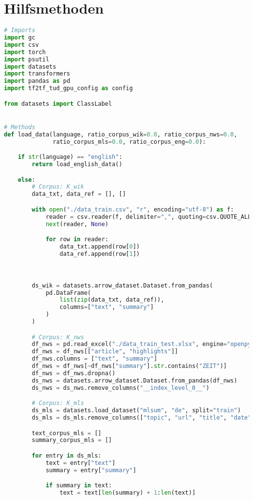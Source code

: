 \section*{Hilfsmethoden}
\begin{lstlisting}[language=Python, caption=Hilfsmethoden]
# Imports
import gc
import csv
import torch
import psutil
import datasets
import transformers
import pandas as pd
import tf2tf_tud_gpu_config as config

from datasets import ClassLabel


# Methods
def load_data(language, ratio_corpus_wik=0.0, ratio_corpus_nws=0.0,
              ratio_corpus_mls=0.0, ratio_corpus_eng=0.0):

    if str(language) == "english":
        return load_english_data()

    else:
        # Corpus: K_wik
        data_txt, data_ref = [], []

        with open("./data_train.csv", "r", encoding="utf-8") as f:
            reader = csv.reader(f, delimiter=",", quoting=csv.QUOTE_ALL)
            next(reader, None)

            for row in reader:
                data_txt.append(row[0])
                data_ref.append(row[1])



        ds_wik = datasets.arrow_dataset.Dataset.from_pandas(
            pd.DataFrame(
                list(zip(data_txt, data_ref)),
                columns=["text", "summary"]
            )
        )

        # Corpus: K_nws
        df_nws = pd.read_excel("./data_train_test.xlsx", engine="openpyxl")
        df_nws = df_nws[["article", "highlights"]]
        df_nws.columns = ["text", "summary"]
        df_nws = df_nws[~df_nws["summary"].str.contains("ZEIT")]
        df_nws = df_nws.dropna()
        ds_nws = datasets.arrow_dataset.Dataset.from_pandas(df_nws)
        ds_nws = ds_nws.remove_columns("__index_level_0__")

        # Corpus: K_mls
        ds_mls = datasets.load_dataset("mlsum", "de", split="train")
        ds_mls = ds_mls.remove_columns(["topic", "url", "title", "date"])

        text_corpus_mls = []
        summary_corpus_mls = []

        for entry in ds_mls:
            text = entry["text"]
            summary = entry["summary"]

            if summary in text:
                text = text[len(summary) + 1:len(text)]


\end{lstlisting}
